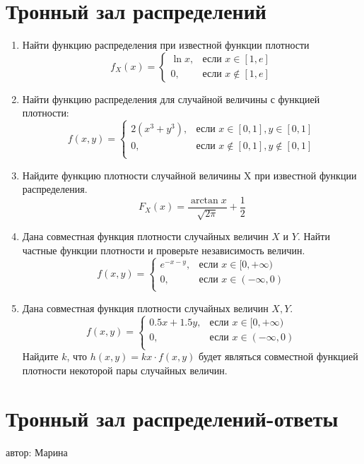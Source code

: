 \documentclass[a4paper,12pt]{article}
\begin{document}
\newpage
\section{Тронный зал распределений} %

\begin{enumerate} %
\item %
Найти функцию распределения при известной функции плотности
\[
f_X(x) =
\begin{cases}
\ln{x},&\text{если } x\in[1, e] \\
0,&\text{если } x\notin[1, e]
\end{cases}
\]
\item
Найти функцию распределения для случайной величины с функцией плотности:
\[
f(x, y) =
\begin{cases}
2(x^3+y^3),&\text{если } x\in[0, 1], y\in[0, 1] \\
0,&\text{если } x\notin[0, 1], y\notin[0, 1] \\
\end{cases}
\]
\item %
Найдите функцию плотности случайной величины X при известной функции распределения.
\[
F_X(x) = \frac{\arctan x}{\sqrt{2\pi}} + \frac{1}{2}
\]
\item %
Дана совместная функция плотности случайных величин $X$ и $Y$. Найти частные функции плотности и проверьте независимость величин.
\[
f(x, y) =
\begin{cases}
e^{-x-y},&\text{если } x\in[0, +\infty) \\
0, &\text{если } x\in(-\infty, 0) \\
\end{cases}
\]
\item Дана совместная функция плотности случайных величин $X, Y$.
\[
f(x, y) =
\begin{cases}
0.5x + 1.5y,&\text{если } x\in[0, +\infty) \\
0, &\text{если } x\in(-\infty, 0) \\
\end{cases}
\]
Найдите $k$,  что $h(x, y) = kx\cdot f(x, y)$ будет являться совместной функцией плотности некоторой пары случайных величин.
\end{enumerate}

\newpage
\section{Тронный зал распределений-ответы}
автор: Марина
\end{document}
